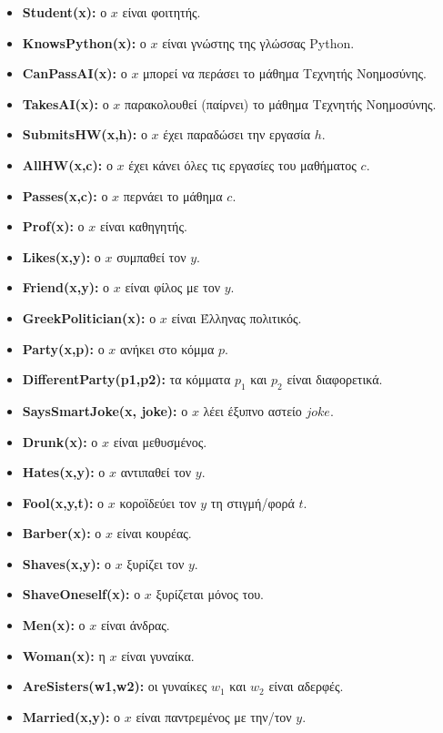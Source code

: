 \documentclass[a4paper,12pt]{article}
\begin{document}
\begin{itemize}
    \item \textbf{Student(x):} ο \(x\) είναι φοιτητής.
    \item \textbf{KnowsPython(x):} ο \(x\) είναι γνώστης της γλώσσας Python.
    \item \textbf{CanPassAI(x):} ο \(x\) μπορεί να περάσει το μάθημα Τεχνητής Νοημοσύνης.
    \item \textbf{TakesAI(x):} ο \(x\) παρακολουθεί (παίρνει) το μάθημα Τεχνητής Νοημοσύνης.
    \item \textbf{SubmitsHW(x,h):} ο \(x\) έχει παραδώσει την εργασία \(h\).
    \item \textbf{AllHW(x,c):} ο \(x\) έχει κάνει όλες τις εργασίες του μαθήματος \(c\).
    \item \textbf{Passes(x,c):} ο \(x\) περνάει το μάθημα \(c\).
    \item \textbf{Prof(x):} ο \(x\) είναι καθηγητής.
    \item \textbf{Likes(x,y):} ο \(x\) συμπαθεί τον \(y\).
    \item \textbf{Friend(x,y):} ο \(x\) είναι φίλος με τον \(y\).
    \item \textbf{GreekPolitician(x):} ο \(x\) είναι Έλληνας πολιτικός.
    \item \textbf{Party(x,p):} ο \(x\) ανήκει στο κόμμα \(p\).
    \item \textbf{DifferentParty(p1,p2):} τα κόμματα \(p_1\) και \(p_2\) είναι διαφορετικά.
    \item \textbf{SaysSmartJoke(x, joke):} ο \(x\) λέει έξυπνο αστείο \(joke\).
    \item \textbf{Drunk(x):} ο \(x\) είναι μεθυσμένος.
    \item \textbf{Hates(x,y):} ο \(x\) αντιπαθεί τον \(y\).
    \item \textbf{Fool(x,y,t):} ο \(x\) κοροϊδεύει τον \(y\) τη στιγμή/φορά \(t\).
    \item \textbf{Barber(x):} ο \(x\) είναι κουρέας.
    \item \textbf{Shaves(x,y):} ο \(x\) ξυρίζει τον \(y\).
    \item \textbf{ShaveOneself(x):} ο \(x\) ξυρίζεται μόνος του.
    \item \textbf{Men(x):} ο \(x\) είναι άνδρας.
    \item \textbf{Woman(x):} η \(x\) είναι γυναίκα.
    \item \textbf{AreSisters(w1,w2):} οι γυναίκες \(w_1\) και \(w_2\) είναι αδερφές.
    \item \textbf{Married(x,y):} ο \(x\) είναι παντρεμένος με την/τον \(y\).

\end{itemize}
\end{document}
